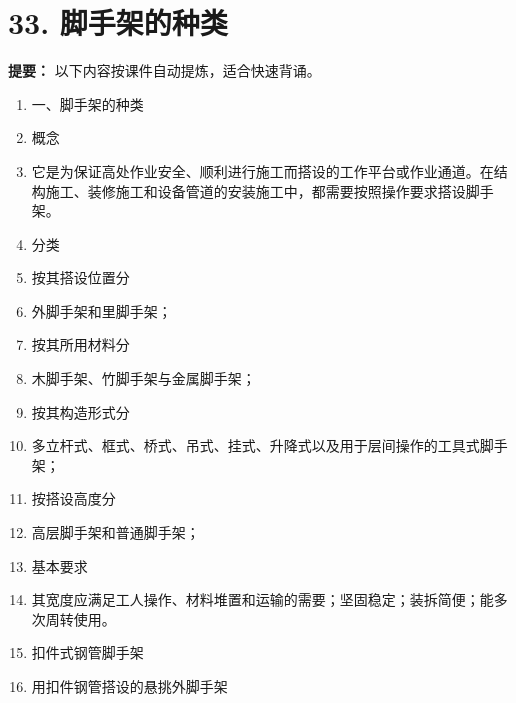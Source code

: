 \documentclass[UTF8,fontset=fandol,11pt]{ctexart}
\begin{document}
\newpage

\section*{33. 脚手架的种类}


\begin{mainbox}

\textbf{提要：} 以下内容按课件自动提炼，适合快速背诵。

\end{mainbox}

\begin{enumerate}[label=\arabic*.]

\item 一、脚手架的种类

\item 概念

\item 它是为保证高处作业安全、顺利进行施工而搭设的工作平台或作业通道。在结构施工、装修施工和设备管道的安装施工中，都需要按照操作要求搭设脚手架。

\item 分类

\item 按其搭设位置分

\item 外脚手架和里脚手架；

\item 按其所用材料分

\item 木脚手架、竹脚手架与金属脚手架；

\item 按其构造形式分

\item 多立杆式、框式、桥式、吊式、挂式、升降式以及用于层间操作的工具式脚手架；

\item 按搭设高度分

\item 高层脚手架和普通脚手架；

\item 基本要求

\item 其宽度应满足工人操作、材料堆置和运输的需要；坚固稳定；装拆简便；能多次周转使用。

\item 扣件式钢管脚手架

\item 用扣件钢管搭设的悬挑外脚手架


\end{enumerate}
\end{document}
